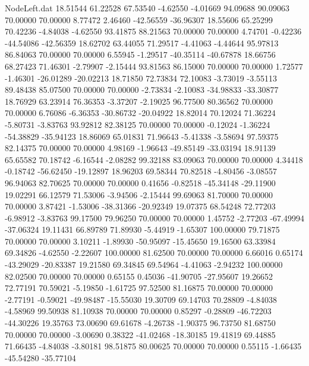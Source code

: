 \begin{filecontents}{NodeLeft.dat}
  18.51544   61.22528   67.53540    -4.62550   -4.01669   94.09688   90.09063   70.00000   70.00000    8.77472    2.46460  -42.56559  -36.96307
  18.55606   65.25299   70.42236    -4.84038   -4.62550   93.41875   88.21563   70.00000   70.00000    4.74701   -0.42236  -44.54086  -42.56359
  18.62702   63.44055   71.29517    -4.41063   -4.44644   95.97813   86.84063   70.00000   70.00000    6.55945   -1.29517  -40.35114  -40.67878
  18.66756   68.27423   71.46301    -2.79907   -2.15444   93.81563   86.15000   70.00000   70.00000    1.72577   -1.46301  -26.01289  -20.02213
  18.71850   72.73834   72.10083    -3.73019   -3.55113   89.48438   85.07500   70.00000   70.00000   -2.73834   -2.10083  -34.98833  -33.30877
  18.76929   63.23914   76.36353    -3.37207   -2.19025   96.77500   80.36562   70.00000   70.00000    6.76086   -6.36353  -30.86732  -20.04922
  18.82014   70.12024   71.36224    -5.80731   -3.83763   93.92812   82.38125   70.00000   70.00000   -0.12024   -1.36224  -54.38829  -35.94123
  18.86069   65.01831   71.96643    -5.41338   -3.58694   97.59375   82.14375   70.00000   70.00000    4.98169   -1.96643  -49.85149  -33.03194
  18.91139   65.65582   70.18742    -6.16544   -2.08282   99.32188   83.09063   70.00000   70.00000    4.34418   -0.18742  -56.62450  -19.12897
  18.96203   69.58344   70.82518    -4.80456   -3.08557   96.94063   82.70625   70.00000   70.00000    0.41656   -0.82518  -45.34148  -29.11900
  19.02291   66.12579   71.53006    -3.94506   -2.15444   99.69063   81.70000   70.00000   70.00000    3.87421   -1.53006  -38.31366  -20.92349
  19.07375   68.54248   72.77203    -6.98912   -3.83763   99.17500   79.96250   70.00000   70.00000    1.45752   -2.77203  -67.49994  -37.06324
  19.11431   66.89789   71.89930    -5.44919   -1.65307  100.00000   79.71875   70.00000   70.00000    3.10211   -1.89930  -50.95097  -15.45650
  19.16500   63.33984   69.34826    -4.62550   -2.22607  100.00000   81.62500   70.00000   70.00000    6.66016    0.65174  -43.29029  -20.83387
  19.21580   69.34845   69.54964    -4.41063   -2.94232  100.00000   82.02500   70.00000   70.00000    0.65155    0.45036  -41.90705  -27.95607
  19.26652   72.77191   70.59021    -5.19850   -1.61725   97.52500   81.16875   70.00000   70.00000   -2.77191   -0.59021  -49.98487  -15.55030
  19.30709   69.14703   70.28809    -4.84038   -4.58969   99.50938   81.10938   70.00000   70.00000    0.85297   -0.28809  -46.72203  -44.30226
  19.35763   73.00690   69.61678    -4.26738   -1.90375   96.73750   81.68750   70.00000   70.00000   -3.00690    0.38322  -41.02468  -18.30185
  19.41819   69.44885   71.66435    -4.84038   -3.80181   98.51875   80.00625   70.00000   70.00000    0.55115   -1.66435  -45.54280  -35.77104

\end{filecontents}
